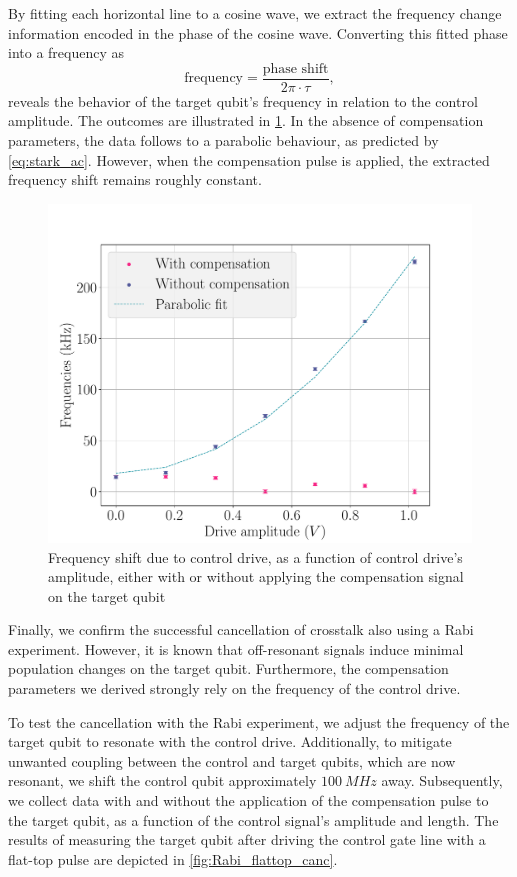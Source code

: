 By fitting each horizontal line to a cosine wave, we extract the frequency change information encoded in the phase of the cosine wave.
Converting this fitted phase into a frequency as
\begin{equation}
\label{eq:get_frequency}
    \text{frequency} = \frac{\text{phase shift}}{2 \pi \cdot \tau} ,
\end{equation}
reveals the behavior of the target qubit's frequency in relation to the control amplitude.
The outcomes are illustrated in \cref{fig:Ramsey_freq}.
In the absence of compensation parameters, the data follows to a parabolic behaviour, as predicted by \cref{eq:stark_ac}.
However, when the compensation pulse is applied, the extracted frequency shift remains roughly constant.

\begin{figure}
    \centering
    \includegraphics[width=0.75\linewidth]{Images//Chap2.0/frequencies.pdf}
    \caption{Frequency shift due to control drive, as a function of control drive's amplitude, either with or without applying the compensation signal on the target qubit}
    \label{fig:Ramsey_freq}
\end{figure}

Finally, we confirm the successful cancellation of crosstalk also using a Rabi experiment. 
However, it is known that off-resonant signals induce minimal population changes on the target qubit. 
Furthermore, the compensation parameters we derived strongly rely on the frequency of the control drive.

To test the cancellation with the Rabi experiment, we adjust the frequency of the target qubit to resonate with the control drive. 
Additionally, to mitigate unwanted coupling between the control and target qubits, which are now resonant, we shift the control qubit approximately $\SI{100}{MHz}$ away. 
Subsequently, we collect data with and without the application of the compensation pulse to the target qubit, as a function of the control signal's amplitude and length.
The results of measuring the target qubit after driving the control gate line with a flat-top pulse are depicted in \cref{fig:Rabi_flattop_canc}.


